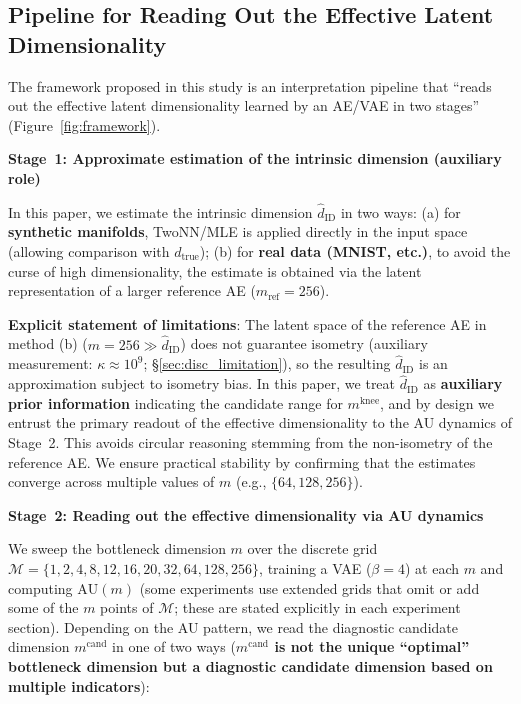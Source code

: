 \documentclass[make,article,submit,pdftex,moreauthors]{Definitions/mdpi}
\newcommand{\dzopt}{m^{\mathrm{cand}}}
\newcommand{\dtrue}{d_{\mathrm{true}}}
\newcommand{\kap}{\kappa}
\newcommand{\mknee}{m^{\mathrm{knee}}}
\begin{document}
\subsection{Pipeline for Reading Out the Effective Latent Dimensionality}\label{sec:framework_pipeline}

The framework proposed in this study is an interpretation pipeline that
``reads out the effective latent dimensionality learned by an AE/VAE in two
stages'' (Figure~\ref{fig:framework}).

\textbf{Stage~1: Approximate estimation of the intrinsic dimension (auxiliary role)}

In this paper, we estimate the intrinsic dimension $\hat{d}_\mathrm{ID}$ in two ways:
(a) for \textbf{synthetic manifolds}, TwoNN/MLE is applied directly in the input
space (allowing comparison with $\dtrue$);
(b) for \textbf{real data (MNIST, etc.)}, to avoid the curse of high
dimensionality, the estimate is obtained via the latent representation of a
larger reference AE ($m_{\mathrm{ref}} = 256$).

\textbf{Explicit statement of limitations}: The latent space of the reference AE
in method (b) ($m = 256 \gg \hat{d}_\mathrm{ID}$) does not guarantee isometry
(auxiliary measurement: $\kap \approx 10^9$; §\ref{sec:disc_limitation}),
so the resulting $\hat{d}_\mathrm{ID}$ is an approximation subject to isometry bias.
In this paper, we treat $\hat{d}_\mathrm{ID}$ as \textbf{auxiliary prior information}
indicating the candidate range for $\mknee$, and by design we entrust the primary
readout of the effective dimensionality to the AU dynamics of Stage~2.
This avoids circular reasoning stemming from the non-isometry of the reference AE.
We ensure practical stability by confirming that the estimates converge across
multiple values of $m$ (e.g., $\{64, 128, 256\}$).

\textbf{Stage~2: Reading out the effective dimensionality via AU dynamics}

We sweep the bottleneck dimension $m$ over the discrete grid
$\mathcal{M} = \{1, 2, 4, 8, 12,\allowbreak 16, 20, 32,\allowbreak 64, 128, 256\}$,
training a VAE ($\beta = 4$) at each $m$ and computing $\mathrm{AU}(m)$
(some experiments use extended grids that omit or add some of the $m$ points of
$\mathcal{M}$; these are stated explicitly in each experiment section).
Depending on the AU pattern, we read the diagnostic candidate dimension
$\dzopt$ in one of two ways
(\textbf{$\dzopt$ is not the unique ``optimal'' bottleneck dimension but a
diagnostic candidate dimension based on multiple indicators}):
\end{document}
